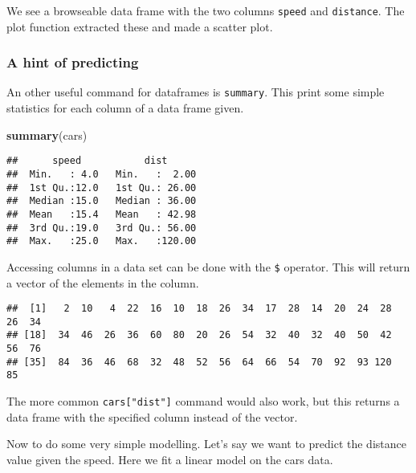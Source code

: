 \documentclass[]{article}
\newenvironment{Shaded}{\begin{snugshade}}{\end{snugshade}}
\newcommand{\KeywordTok}[1]{\textcolor[rgb]{0.13,0.29,0.53}{\textbf{#1}}}
\newcommand{\StringTok}[1]{\textcolor[rgb]{0.31,0.60,0.02}{#1}}
\newcommand{\OperatorTok}[1]{\textcolor[rgb]{0.81,0.36,0.00}{\textbf{#1}}}
\newcommand{\NormalTok}[1]{#1}
\begin{document}
We see a browseable data frame with the two columns \texttt{speed} and
\texttt{distance}. The plot function extracted these and made a scatter
plot.

\subsubsection{A hint of predicting}\label{a-hint-of-predicting}

An other useful command for dataframes is \texttt{summary}. This print
some simple statistics for each column of a data frame given.

\begin{Shaded}
\begin{Highlighting}[]
\KeywordTok{summary}\NormalTok{(cars)}
\end{Highlighting}
\end{Shaded}

\begin{verbatim}
##      speed           dist       
##  Min.   : 4.0   Min.   :  2.00  
##  1st Qu.:12.0   1st Qu.: 26.00  
##  Median :15.0   Median : 36.00  
##  Mean   :15.4   Mean   : 42.98  
##  3rd Qu.:19.0   3rd Qu.: 56.00  
##  Max.   :25.0   Max.   :120.00
\end{verbatim}

Accessing columns in a data set can be done with the \texttt{\$}
operator. This will return a vector of the elements in the column.

\begin{Shaded}
\end{Shaded}

\begin{verbatim}
##  [1]   2  10   4  22  16  10  18  26  34  17  28  14  20  24  28  26  34
## [18]  34  46  26  36  60  80  20  26  54  32  40  32  40  50  42  56  76
## [35]  84  36  46  68  32  48  52  56  64  66  54  70  92  93 120  85
\end{verbatim}

The more common \texttt{cars{[}"dist"{]}} command would also work, but
this returns a data frame with the specified column instead of the
vector.

Now to do some very simple modelling. Let's say we want to predict the
distance value given the speed. Here we fit a linear model on the cars
data.

\begin{Shaded}
\end{Shaded}
\end{document}
